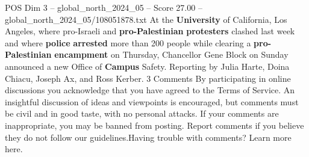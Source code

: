 \begin{textsample}{POS Dim 3 – global\_north\_2024\_05 – Score 27.00 – global\_north\_2024\_05/108051878.txt}
At the \textbf{University} of California, Los Angeles, where pro-Israeli and \textbf{pro-Palestinian} \textbf{protesters} clashed last week and where \textbf{police} \textbf{arrested} more than 200 people while clearing a \textbf{pro-Palestinian} \textbf{encampment} on Thursday, Chancellor Gene Block on Sunday announced a new Office of \textbf{Campus} Safety.
Reporting by Julia Harte, Doina Chiacu, Joseph Ax, and Ross Kerber. 3 Comments By participating in online discussions you acknowledge that you have agreed to the Terms of Service.
An insightful discussion of ideas and viewpoints is encouraged, but comments must be civil and in good taste, with no personal attacks.
If your comments are inappropriate, you may be banned from posting.
Report comments if you believe they do not follow our guidelines.Having trouble with comments?
Learn more here.

\end{textsample}
